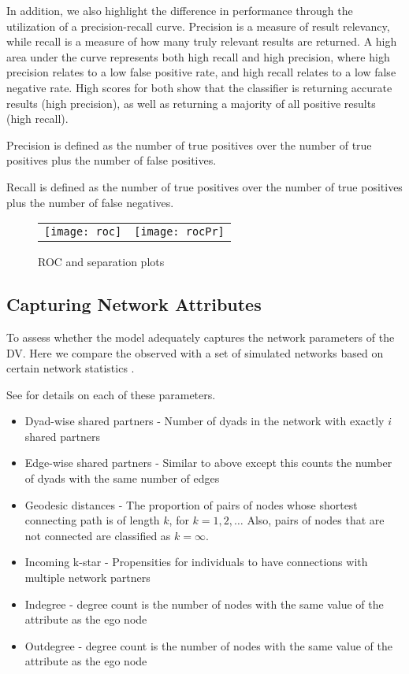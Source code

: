 In addition, we also highlight the difference in performance through the utilization of a precision-recall curve. Precision is a measure of result relevancy, while recall is a measure of how many truly relevant results are returned. A high area under the curve represents both high recall and high precision, where high precision relates to a low false positive rate, and high recall relates to a low false negative rate. High scores for both show that the classifier is returning accurate results (high precision), as well as returning a majority of all positive results (high recall). 

Precision is defined as the number of true positives over the number of true positives plus the number of false positives. 

Recall is defined as the number of true positives over the number of true positives plus the number of false negatives. 

\begin{figure}[ht]
	\centering
	\begin{tabular}{cc}
	\texttt{[image: roc]} & 
	\texttt{[image: rocPr]}	
	\end{tabular}
	\caption{ROC and separation plots}
	\label{fig:roc}
\end{figure}
\FloatBarrier

\subsection{Capturing Network Attributes}

To assess whether the model adequately captures the network parameters of the DV. Here we compare the observed with a set of simulated networks based on certain network statistics \citep{hunter:etal:2008}. 

See \citet{morris:etal:2008} for details on each of these parameters. 

\begin{itemize}
\item Dyad-wise shared partners - Number of dyads in the network with exactly $i$ shared partners
\item Edge-wise shared partners - Similar to above except this counts the number of dyads with the same number of edges
\item Geodesic distances - The proportion of pairs of nodes whose shortest connecting path is of length $k$, for $k=1,2,\ldots$ Also, pairs of nodes that are not connected are classified as $k=\infty$.
\item Incoming k-star - Propensities for individuals to have connections with multiple network partners
\item Indegree - degree count is the number of nodes with the same value of the attribute as the ego node
\item Outdegree - degree count is the number of nodes with the same value of the attribute as the ego node
\end{itemize}

